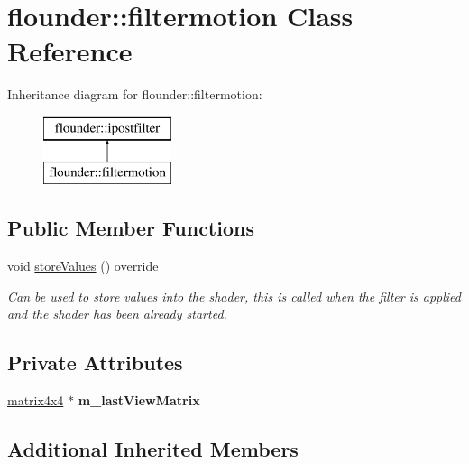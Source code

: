 \hypertarget{classflounder_1_1filtermotion}{}\section{flounder\+:\+:filtermotion Class Reference}
\label{classflounder_1_1filtermotion}
Inheritance diagram for flounder\+:\+:filtermotion\+:\begin{figure}[H]
\begin{center}
\leavevmode
\includegraphics[height=2.000000cm]{classflounder_1_1filtermotion}
\end{center}
\end{figure}
\subsection*{Public Member Functions}
\begin{DoxyCompactItemize}
\item 
void \hyperlink{classflounder_1_1filtermotion_a6e8b5a9ce3660ab57fbb487fe6752acb}{store\+Values} () override
\begin{DoxyCompactList}\small\item\em Can be used to store values into the shader, this is called when the filter is applied and the shader has been already started. \end{DoxyCompactList}\end{DoxyCompactItemize}
\subsection*{Private Attributes}
\begin{DoxyCompactItemize}
\item 
\mbox{\label{classflounder_1_1filtermotion_a3d2b6639e87b9e747f62a5ba0206b5fa}} 
\hyperlink{classflounder_1_1matrix4x4}{matrix4x4} $\ast$ {\bfseries m\+\_\+last\+View\+Matrix}
\end{DoxyCompactItemize}
\subsection*{Additional Inherited Members}


